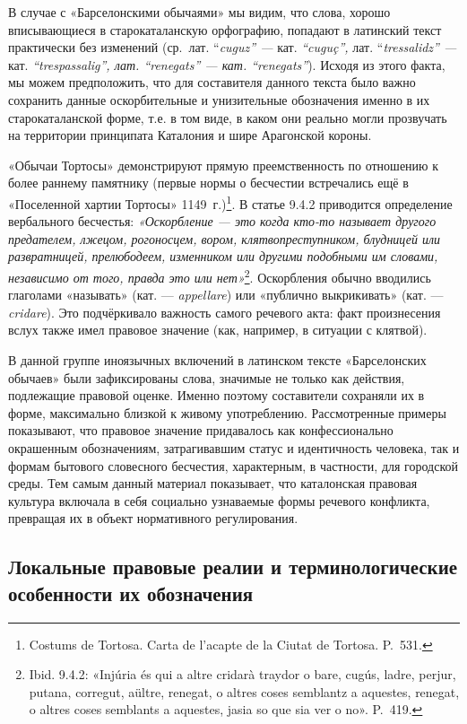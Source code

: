 В случае с «Барселонскими обычаями» мы видим, что слова, хорошо вписывающиеся в старокаталанскую орфографию, попадают в латинский текст практически без изменений (ср.~лат. “\emph{cuguz}\emph{” --- }кат.\emph{ “cuguç”, }лат. “\emph{t}\emph{ressalidz” --- }кат.\emph{ “trespassalig”, лат. “}\emph{renegats}\emph{” --- кат. “}\emph{renegats}\emph{”}). Исходя из этого факта, мы можем предположить, что для составителя данного текста было важно сохранить данные оскорбительные и унизительные обозначения именно в их старокаталанской форме, т.е. в том виде, в каком они реально могли прозвучать на территории принципата Каталония и шире Арагонской короны.

«Обычаи Тортосы» демонстрируют прямую преемственность по отношению к более раннему памятнику (первые нормы о бесчестии встречались ещё в «Поселенной хартии Тортосы» 1149~г.)\footnote{Costums de Tortosa. Carta de l'acapte de la Ciutat de Tortosa. P.~531.}. В статье 9.4.2 приводится определение вербального бесчестья: \emph{«Оскорбление --- это когда кто-то называет другого предателем, лжецом, рогоносцем, вором, клятвопреступником, блудницей или развратницей, прелюбодеем, изменником или другими подобными им словами, независимо от того, правда это или нет»}\footnote{Ibid. 9.4.2: «Injúria és qui a altre cridarà traydor o bare, cugús, ladre, perjur, putana, corregut, aültre, renegat, o altres coses semblantz a aquestes, renegat, o altres coses semblants a aquestes, jasia so que sia ver o no». P.~419.}. Оскорбления обычно вводились глаголами «называть» (кат. --- \emph{appellare}) или «публично выкрикивать» (кат. --- \emph{cridare}). Это подчёркивало важность самого речевого акта: факт произнесения вслух также имел правовое значение (как, например, в ситуации с клятвой).

В данной группе иноязычных включений в латинском тексте «Барселонских обычаев» были зафиксированы слова, значимые не только как действия, подлежащие правовой оценке. Именно поэтому составители сохраняли их в форме, максимально близкой к живому употреблению. Рассмотренные примеры показывают, что правовое значение придавалось как конфессионально окрашенным обозначениям, затрагивавшим статус и идентичность человека, так и формам бытового словесного бесчестия, характерным, в частности, для городской среды. Тем самым данный материал показывает, что каталонская правовая культура включала в себя социально узнаваемые формы речевого конфликта, превращая их в объект нормативного регулирования.

\subsection{Локальные правовые реалии и терминологические особенности их обозначения}

